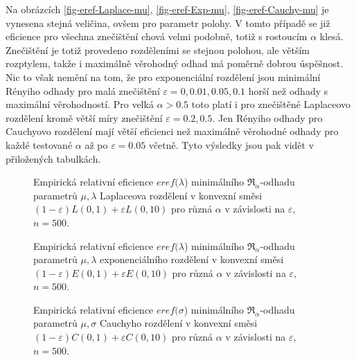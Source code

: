 Na obrázcích \ref{fig-eref-Laplace-mu}, \ref{fig-eref-Exp-mu}, \ref{fig-eref-Cauchy-mu} je vynesena stejná veličina, ovšem pro parametr polohy. V tomto případě se již eficience pro všechna znečištění chová velmi podobně, totiž s rostoucím $\alpha$ klesá. Znečištění je totiž provedeno rozděleními se stejnou polohou, ale větším rozptylem, takže i maximálně věrohodný odhad má poměrně dobrou úspěšnost. Nic to však nemění na tom, že pro exponenciální rozdělení jsou minimální Rényiho odhady pro malá znečištění $\varepsilon = 0, 0.01, 0.05, 0.1$ horší než odhady s maximální věrohodností. Pro velká $\alpha > 0.5$ toto platí i pro znečištěné Laplaceovo rozdělení kromě větší míry znečištění $\varepsilon = 0.2, 0.5$. Jen Rényiho odhady pro Cauchyovo rozdělení mají větší eficienci než maximálně věrohodné odhady pro každé testované $\alpha$ až po $\varepsilon = 0.05$ včetně. Tyto výsledky jsou pak vidět v přiložených tabulkách.

\begin{figure}[htb!]
	\begin{center}
		\caption{ Empirická relativní eficience $eref({\lambda}$) minimálního $\mathfrak{R}_\alpha$-odhadu parametrů  $\mu,\lambda$ Laplaceova rozdělení v konvexní směsi	$(1-\varepsilon)L(0,1) + \varepsilon L(0,10)$ pro různá $\alpha$ v závislosti na $\varepsilon$, $n=500$. }
		\label{fig-erefe-Lap-lambda}
	\end{center}
\end{figure}

\begin{figure}[htb!]
	\begin{center}
		\caption{ Empirická relativní eficience $eref({\lambda}$) minimálního $\mathfrak{R}_\alpha$-odhadu parametrů  $\mu,\lambda$ exponenciálního rozdělení v konvexní směsi	$(1-\varepsilon)E(0,1) + \varepsilon E(0,10)$ pro různá $\alpha$ v závislosti na $\varepsilon$, $n=500$. }
		\label{fig-erefe-Exp-lambda}
	\end{center}
\end{figure}

\begin{figure}[htb!]
	\begin{center}
		\caption{ Empirická relativní eficience $eref({\sigma}$) minimálního $\mathfrak{R}_\alpha$-odhadu parametrů  $\mu,\sigma$ Cauchyho rozdělení v konvexní směsi	$(1-\varepsilon)C(0,1) + \varepsilon C(0,10)$ pro různá $\alpha$ v závislosti na $\varepsilon$, $n=500$. }
		\label{fig-erefe-Cauchy-sigma}
	\end{center}
\end{figure}

